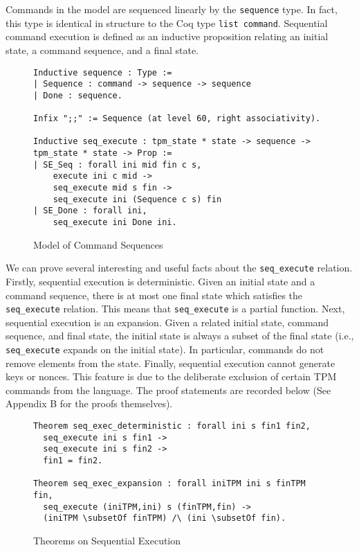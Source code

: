 Commands in the model are sequenced linearly by the \verb|sequence| type. In fact, this type is identical in structure to the Coq type \verb|list command|. Sequential command execution is defined as an inductive proposition relating an initial state, a command sequence, and a final state. 
\begin{figure}[h]
\begin{lstlisting}[language=Coq]
Inductive sequence : Type :=
| Sequence : command -> sequence -> sequence
| Done : sequence.

Infix ";;" := Sequence (at level 60, right associativity).

Inductive seq_execute : tpm_state * state -> sequence -> tpm_state * state -> Prop :=
| SE_Seq : forall ini mid fin c s,
    execute ini c mid ->
    seq_execute mid s fin ->
    seq_execute ini (Sequence c s) fin
| SE_Done : forall ini,
    seq_execute ini Done ini.
\end{lstlisting}
\caption{Model of Command Sequences}
\end{figure}
We can prove several interesting and useful facts about the \verb|seq_execute| relation. Firstly, sequential execution is deterministic. Given an initial state and a command sequence, there is at most one final state which satisfies the \verb|seq_execute| relation. This means that \verb|seq_execute| is a partial function. Next, sequential execution is an expansion. Given a related initial state, command sequence, and final state, the initial state is  always a subset of the final state (i.e., \verb|seq_execute| expands on the initial state). In particular, commands do not remove elements from the state. Finally, sequential execution cannot generate keys or nonces. This feature is due to the deliberate exclusion of certain TPM commands from the language. The proof statements are recorded below (See Appendix B for the proofs themselves).
\begin{figure}[h]
\begin{lstlisting}[language=Coq]
Theorem seq_exec_deterministic : forall ini s fin1 fin2,
  seq_execute ini s fin1 ->
  seq_execute ini s fin2 ->
  fin1 = fin2.

Theorem seq_exec_expansion : forall iniTPM ini s finTPM fin,
  seq_execute (iniTPM,ini) s (finTPM,fin) ->
  (iniTPM \subsetOf finTPM) /\ (ini \subsetOf fin).
\end{lstlisting}
\caption{Theorems on Sequential Execution}
\end{figure}
